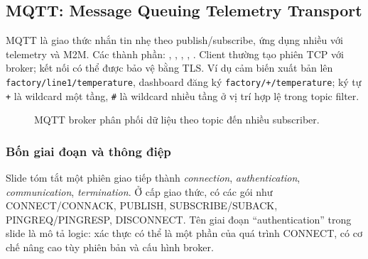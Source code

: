 \subsection{MQTT: Message Queuing Telemetry Transport}
MQTT là giao thức nhắn tin nhẹ theo publish/subscribe, ứng dụng nhiều với telemetry và M2M. Các thành phần: , , , , . Client thường tạo phiên TCP với broker; kết nối có thể được bảo vệ bằng TLS. Ví dụ cảm biến xuất bản lên \texttt{factory/line1/temperature}, dashboard đăng ký \texttt{factory/+/temperature}; ký tự \texttt{+} là wildcard một tầng, \texttt{\#} là wildcard nhiều tầng ở vị trí hợp lệ trong topic filter.
\begin{figure}[htbp]\centering
{}\caption{MQTT broker phân phối dữ liệu theo topic đến nhiều subscriber.}
\end{figure}
\subsubsection{Bốn giai đoạn và thông điệp}
Slide tóm tắt một phiên giao tiếp thành \emph{connection}, \emph{authentication}, \emph{communication}, \emph{termination}. Ở cấp giao thức, có các gói như CONNECT/CONNACK, PUBLISH, SUBSCRIBE/SUBACK, PINGREQ/PINGRESP, DISCONNECT. Tên giai đoạn ``authentication'' trong slide là mô tả logic: xác thực có thể là một phần của quá trình CONNECT, có cơ chế nâng cao tùy phiên bản và cấu hình broker.
